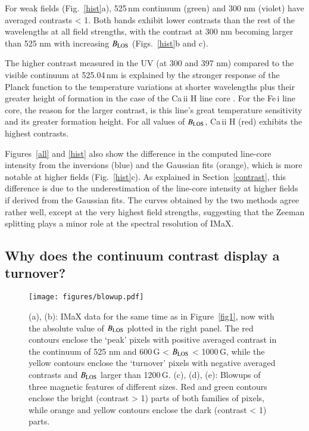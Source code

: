 \documentclass[goettingen, gauss, print]{thesis}
\begin{document}
For weak fields (Fig.~\ref{hist}a), 525\,nm continuum (green) and 300 nm (violet) have averaged contrasts < 1. Both bands exhibit lower contrasts than the rest of the wavelengths at all field strengths, with the contrast at 300 nm becoming larger than 525 nm with increasing $B_{\rm LOS}$ (Figs.~\ref{hist}b and c).

The higher contrast measured in the UV (at 300 and 397 nm) compared to the visible continuum at 525.04\,nm is explained by the stronger response of the Planck function to the temperature variations at shorter wavelengths plus their greater height of formation in the case of the Ca\,{\sc ii} H line core . For the Fe\,{\sc i} line core, the reason for the larger contrast, is this line's great temperature sensitivity and its greater formation height. For all values of $B_{\rm LOS}$, Ca\,{\sc ii} H (red) exhibits the highest contrasts.

Figures~\ref{all} and \ref{hist} also show the difference in the computed line-core intensity from the inversions (blue) and the Gaussian fits (orange), which is more notable at higher fields (Fig.~\ref{hist}c). As explained in Section~\ref{contrast}, this difference is due to the underestimation of the line-core intensity at higher fields if derived from the Gaussian fits. The curves obtained by the two methods agree rather well, except at the very highest field strengths, suggesting that the Zeeman splitting plays a minor role at the spectral resolution of IMaX.




\subsection{Why does the continuum contrast display a turnover?}
\label{turnover}

\begin{figure*}[ht!]
\centering
\texttt{[image: figures/blowup.pdf]}
\caption{(a), (b): IMaX data for the same time as in Figure~\ref{fig1}, now with the absolute value of $B_{\rm LOS}$ plotted in the right panel. The red contours enclose the `peak' pixels with positive averaged contrast in the continuum of 525 nm and 600\,G < $B_{\rm LOS}$ < 1000\,G, while the yellow contours enclose the `turnover' pixels with negative averaged contrasts and $B_{\rm LOS}$ larger than 1200\,G. (c), (d), (e): Blowups of three magnetic features of different sizes. Red and green contours enclose the bright (contrast > 1) parts of both families of pixels, while orange and yellow contours enclose the dark (contrast < 1) parts.
}
\label{contour}
\end{figure*}
\end{document}
